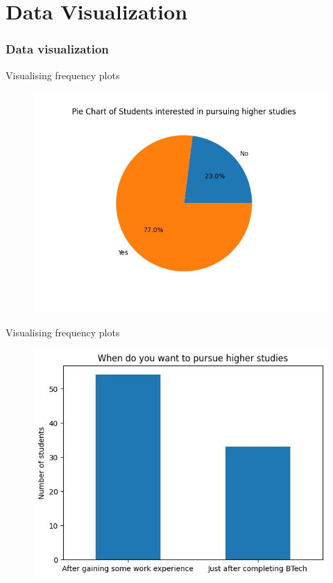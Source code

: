 \documentclass{beamer}
\begin{document}
\section{Data Visualization}
\begin{frame}
  \frametitle{Data visualization}
  \begin{block}{Visualising frequency plots}
  \begin{figure}
  \centering
  \includegraphics[scale=0.37]{yes or no.jpg}
  \label{fig:1}
  \end{figure}
  \end{block}
\end{frame}

\begin{frame}
  \begin{block}{Visualising frequency plots}
  \begin{figure}
  \centering
  \includegraphics[scale=0.63]{just.jpg}
  \label{fig:2}
  \end{figure}
  \end{block}
\end{frame}
\end{document}
